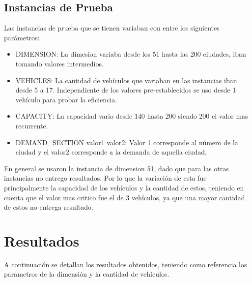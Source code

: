 \documentclass[letter, 10pt]{article}
\begin{document}
	\subsection{Instancias de Prueba}
	
Las instancias de prueba que se tienen variaban con entre los siguientes par\'ametros:

	\begin{itemize}
		\item DIMENSION: La dimesion variaba desde los 51 hasta las 200 ciudades, iban tomando valores intermedios.
		\item VEHICLES: La cantidad de veh\'iculos que variaban en las instancias iban desde 5 a 17. Independiente de los valores pre-establecidos se uso desde 1 veh\'iculo para probar la eficiencia.
		\item CAPACITY: La capacidad vario desde 140 hasta 200 siendo 200 el valor mas recurrente.
		\item DEMAND\_SECTION valor1 valor2: Valor 1 corresponde al n\'umero de la ciudad y el valor2 corresponde a la demanda de aquella ciudad.
	\end{itemize}
	En general se usaron la instancia de dimension 51, dado que para las otras instancias no entrego resultados. Por lo que la variaci\'on de esta fue principalmente la capacidad de los veh\'iculos y la cantidad de estos, teniendo en cuenta que el valor mas critico fue el de 3 veh\'iculos, ya que una mayor cantidad de estos no entrega resultado.

\newpage
\section{Resultados}
A continuaci\'on se detallan los resultados obtenidos, teniendo como referencia los parametros de la dimensi\'on y la cantidad de veh\'iculos.
\end{document}
